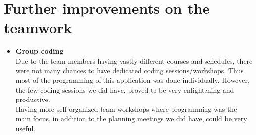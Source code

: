 \section{Further improvements on the teamwork}
\vspace{-5mm}
\begin{itemize}
 \item \textbf{Group coding} \\ Due to the team members having vastly different courses and schedules, there were not many chances to have dedicated coding sessions/workshops. Thus most of the programming of this application was done individually. However, the few coding sessions we did have, proved to be very enlightening and productive. \\Having more self-organized team workshops where programming was the main focus, in addition to the planning meetings we did have, could be very useful.\\
 
\end{itemize}